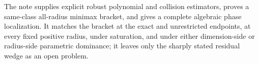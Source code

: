 The note supplies explicit robust polynomial and collision estimators, proves a same-class all-radius minimax bracket, and gives a complete algebraic phase localization.  It matches the bracket at the exact and unrestricted endpoints, at every fixed positive radius, under saturation, and under either dimension-side or radius-side parametric dominance; it leaves only the sharply stated residual wedge as an open problem.